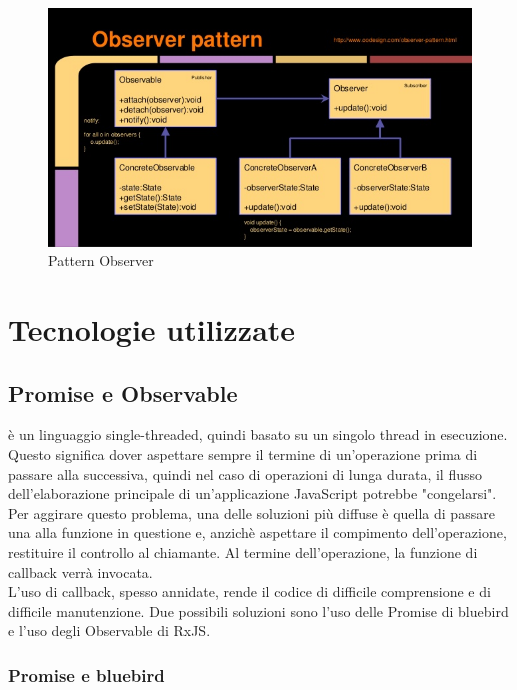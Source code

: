 	\begin{figure}[h]
		\centering
		\includegraphics[width=\textwidth,height=\textheight,keepaspectratio,scale=0.1]{images/observerpattern.png}
		\caption{Pattern Observer}\label{fig:obs1}
	\end{figure}
	\newpage
	\section{Tecnologie utilizzate}
	\subsection{Promise e Observable}


 è un linguaggio single-threaded, quindi basato su un singolo thread in esecuzione. Questo significa dover aspettare sempre il termine di un'operazione prima di passare alla
successiva, quindi nel caso di operazioni di lunga durata, il flusso dell'elaborazione principale di un’applicazione JavaScript potrebbe "congelarsi". \\
Per aggirare questo problema, una delle soluzioni più diffuse è quella di passare una  alla funzione in questione e, anzichè aspettare il compimento dell'operazione, restituire
il controllo al chiamante. Al termine dell'operazione, la funzione di callback verrà invocata. \\


L'uso di callback, spesso annidate, rende il codice di difficile comprensione e di difficile manutenzione. Due possibili soluzioni sono l'uso delle Promise di bluebird e l'uso degli Observable
di RxJS.


\subsubsection{Promise e bluebird}

